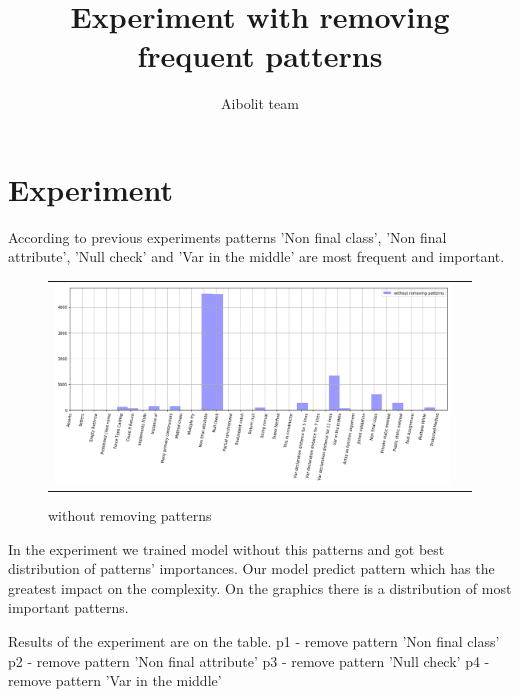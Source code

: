\documentclass[12pt]{article}
\title{Experiment with removing frequent patterns}
\author{Aibolit team}
\begin{document}
\maketitle
\newpage
\section*{Experiment}
According to previous experiments
patterns 'Non final class', 
'Non final attribute', 
'Null check' and 
'Var in the middle' 
are most frequent and important. 

\begin{figure}[h!]\center
	\begin{tabular}{cc}
		\includegraphics[scale=0.4]{3.png}
	\end{tabular}
	\caption{without removing patterns}
	\label{fig:ris3}
\end{figure}

In the experiment we trained
model without this patterns
and got best distribution of
patterns' importances. 
Our model predict pattern which
has the greatest impact on the
complexity. On the graphics
there is a distribution of 
most important
patterns. 

\newpage
Results of the experiment
are on the table.
\newline
p1 - remove pattern 'Non final class'
\newline
p2 - remove pattern 'Non final attribute'
\newline
p3 - remove pattern 'Null check'
\newline
p4 - remove pattern 'Var in the middle'
\newline
\end{document}

